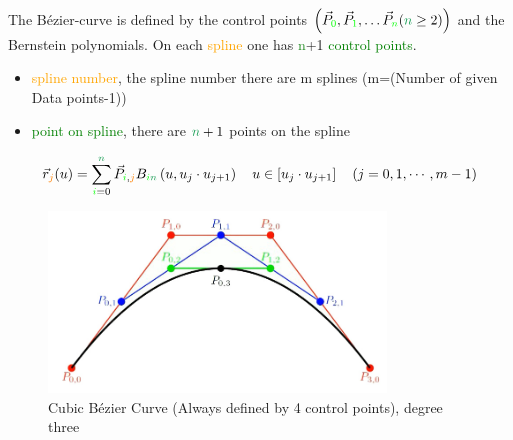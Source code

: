 The Bézier-curve is defined by the control points $\left(\vec{P}_{\textcolor{green}{0}}, \vec{P}_{\textcolor{green}{1}}, \ldots \vec{P}_{\textcolor{green}{n}}(\textcolor{ForestGreen}{n} \geq 2)\right)$ and the  Bernstein polynomials. On each \textcolor{orange}{spline} one has \textcolor{ForestGreen}{n}+1 \textcolor{green}{control points}.
\begin{itemize}
    \item \textcolor{orange}{spline number}, the spline number there are m splines (m=(Number of given Data points-1))
    \item \textcolor{green}{point on spline}, there are $\textcolor{ForestGreen}{n}+1$ points on the spline
\end{itemize}
$$
\vec{r}_{\textcolor{orange}{j}}(u)=\sum_{\textcolor{green}{i}=0}^{\textcolor{ForestGreen}{n}} \vec{P}_{\textcolor{green}{i}, \textcolor{orange}{j}} B_{\textcolor{green}{i} \textcolor{ForestGreen}{n}}\left(u, u_j \cdot u_{j+1}\right) \quad u \in\left[u_j \cdot u_{j+1}\right] \quad(j=0,1, \cdots, m-1)
$$
\begin{figure}[ht!]
    \centering
    \includegraphics[width=0.8\textwidth]{images/cubic_bezier_curve.jpg}
    \caption{Cubic Bézier Curve (Always defined by 4 control points), degree three}
    \label{fig:bezier_curve}
\end{figure}
